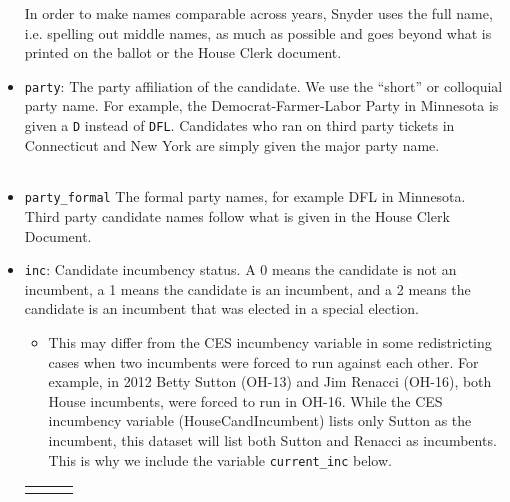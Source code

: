 \documentclass[12pt]{article}
\begin{document}
\begin{itemize}[leftmargin=*]
In order to make names comparable across years, Snyder uses the full name, i.e. spelling out middle names, as much as possible and goes beyond what is printed on the ballot or the House Clerk document.

\item \texttt{party}: The party affiliation of the candidate. We use the ``short'' or colloquial party name. For example, the Democrat-Farmer-Labor Party in Minnesota is given a \texttt{D} instead of \texttt{DFL}. Candidates who ran on third party tickets in Connecticut and New York are simply given the major party name.   %



\begin{tabularx}{\linewidth}{C}
  
\end{tabularx}

\item \texttt{party\_formal} The formal party names, for example DFL in Minnesota. Third party candidate names follow what is given in the House Clerk Document. 

\item \texttt{inc}: Candidate incumbency status. A 0 means the candidate is not an incumbent, a 1 means the candidate is an incumbent, and a 2 means the candidate is an incumbent that was elected in a special election. 
\begin{itemize}
\item This may differ from the CES incumbency variable in some redistricting cases when two incumbents were forced to run against each other. For example, in 2012 Betty Sutton (OH-13) and Jim Renacci (OH-16), both House incumbents, were forced to run in OH-16. While the CES incumbency variable (HouseCandIncumbent) lists only Sutton as the incumbent, this dataset will list both Sutton and Renacci as incumbents. This is why we include the variable  \texttt{current\_inc} below.  
\end{itemize}

    \begin{tabularx}{\linewidth}{CCC}
     &  & 
    \end{tabularx}


\end{itemize}
\end{document}
